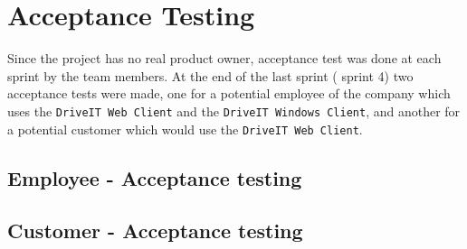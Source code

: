 \section{Acceptance Testing}
Since the project has no real product owner, acceptance test was done at each sprint by the team members. At the end of the last sprint ( sprint 4) two acceptance tests were made, one for a potential employee of the company which uses the \texttt{DriveIT Web Client} and the \texttt{DriveIT Windows Client}, and another for a potential customer which would use the \texttt{DriveIT Web Client}.
\subsection{Employee - Acceptance testing}

\subsection{Customer - Acceptance testing}